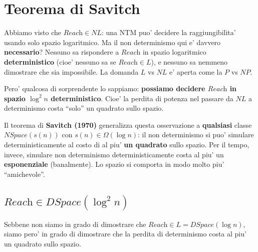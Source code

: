 \section{Teorema di Savitch}

Abbiamo visto che $\textit{Reach} \in NL$: una NTM puo' decidere la raggiungibilita' usando solo spazio logaritmico. Ma il non determinismo qui e' davvero \textbf{necessario}? Nessuno sa rispondere a $\textit{Reach}$ in spazio logaritmico \textbf{deterministico} (cioe' nessuno sa se $\textit{Reach} \in L$), e nessuno sa nemmeno dimostrare che sia impossibile. La domanda $L$ vs $NL$ e' aperta come la $P$ vs $NP$.

Pero' qualcosa di sorprendente lo sappiamo: \textbf{possiamo decidere $\textit{Reach}$ in spazio $\log^2 n$ deterministico}. Cioe' la perdita di potenza nel passare da $NL$ a determinismo costa ``solo'' un quadrato sullo spazio.

Il teorema di \textbf{Savitch (1970)} generalizza questa osservazione a \textbf{qualsiasi} classe $NSpace(s(n))$ con $s(n) \in \Omega(\log n)$: il non determinismo si puo' simulare deterministicamente al costo di al piu' \textbf{un quadrato} sullo spazio. Per il tempo, invece, simulare non determinismo deterministicamente costa al piu' un \textbf{esponenziale} (banalmente). Lo spazio si comporta in modo molto piu' ``amichevole''.

\subsection{$\textit{Reach} \in DSpace(\log^2 n)$}

Sebbene non siamo in grado di dimostrare che $\textit{Reach} \in L = DSpace(\log n)$, siamo pero' in grado di dimostrare che la perdita di determinismo costa al piu' un quadrato sullo spazio.

